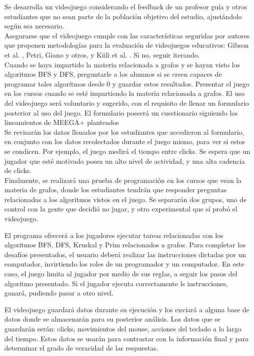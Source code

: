 \documentclass[submission]{eptcs}
\begin{document}
Se desarrolla un videojuego considerando el feedback de un profesor guía y otros estudiantes
que no sean parte de la población objetivo del estudio, ajustándolo según sea necesario. \\
Asegurarse que el videojuego cumple con las características seguridas por autores que proponen
metodologías para la evaluación de videojuegos educativos: Gibson et al. \cite{evaluation_of_games_for_teaching_cs},
Petri, Giano y otros, \cite{petri2018method} y Kiili et al. \cite{using_videogames_maths}. Si no, seguir iterando. \\
Cuando se haya impartido la materia relacionada a grafos y se hayan visto los algoritmos BFS y DFS, preguntarle a
los alumnos si se creen capaces de programar tales algoritmos desde 0 y guardar estos resultados.
Presentar el juego en los cursos cuando se esté impartiendo la materia relacionada a grafos. El uso del
videojuego será voluntario y sugerido, con el requisito de llenar un formulario posterior al uso del juego.
El formulario poseerá un cuestionario siguiendo los lineamientos de MEEGA+ planteados \cite{petri2018meegaplus} \\
Se revisarán los datos llenados por los estudiantes que accedieron al formulario, en conjunto con los
datos recolectados durante el juego mismo, para ver si estos se condicen. Por ejemplo, el juego medirá el tiempo
entre clicks. Se espera que un jugador que esté motivado posea un alto nivel de actividad, y una alta cadencia de clicks. \\
Finalmente, se realizará una prueba de programación en los cursos que vean la materia de grafos, donde los estudiantes
tendrán que responder preguntas relacionadas a los algoritmos vistos en el juego. Se separarán dos grupos, 
uno de control con la gente que decidió no jugar, y otro experimental que sí probó el videojuego.

El programa ofrecerá a los jugadores ejecutar tareas relacionadas con los algoritmos BFS, DFS, Kruskal y Prim relacionados a grafos.
Para completar los desafíos presentados, el usuario deberá realizar las instrucciones dictadas por un computador, invirtiendo los roles
de un programador y un computador. En este caso, el juego limita al jugador por medio de sus reglas, a seguir los pasos del algoritmo 
presentado. Si el jugador ejecuta correctamente ls instrucciones, ganará, pudiendo pasar a otro nivel.

El videojuego guardará datos durante su ejecución y los enviará a alguna base de datos donde se almacenarán para su posterior
análisis. Los datos que se guardarán serán: clicks, movimientos del mouse, acciones del teclado a lo largo del tiempo.
Estos datos se usarán para contrastar con la información final y para determinar el grado de veracidad de las respuestas.
\end{document}
